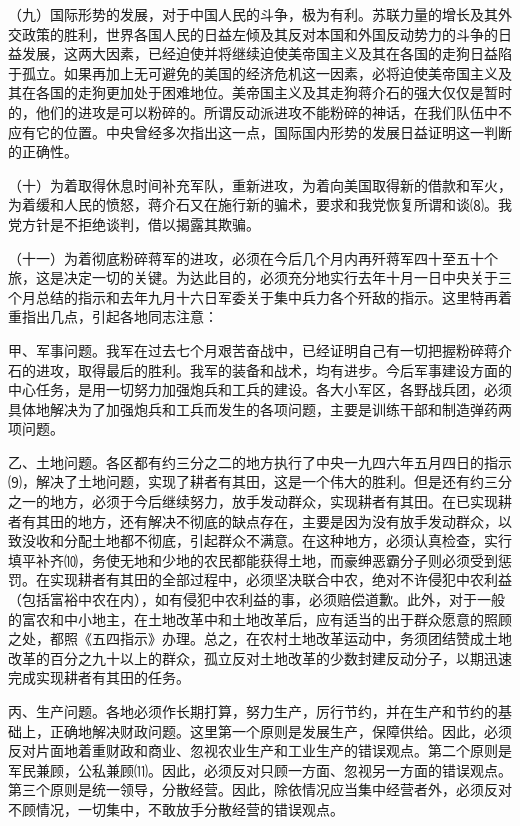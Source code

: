 \documentclass[UTF-8, a5paper, 12pt]{ctexart}
\begin{document}
（九）国际形势的发展，对于中国人民的斗争，极为有利。苏联力量的增长及其外交政策的胜利，世界各国人民的日益左倾及其反对本国和外国反动势力的斗争的日益发展，这两大因素，已经迫使并将继续迫使美帝国主义及其在各国的走狗日益陷于孤立。如果再加上无可避免的美国的经济危机这一因素，必将迫使美帝国主义及其在各国的走狗更加处于困难地位。美帝国主义及其走狗蒋介石的强大仅仅是暂时的，他们的进攻是可以粉碎的。所谓反动派进攻不能粉碎的神话，在我们队伍中不应有它的位置。中央曾经多次指出这一点，国际国内形势的发展日益证明这一判断的正确性。

（十）为着取得休息时间补充军队，重新进攻，为着向美国取得新的借款和军火，为着缓和人民的愤怒，蒋介石又在施行新的骗术，要求和我党恢复所谓和谈⑻。我党方针是不拒绝谈判，借以揭露其欺骗。

（十一）为着彻底粉碎蒋军的进攻，必须在今后几个月内再歼蒋军四十至五十个旅，这是决定一切的关键。为达此目的，必须充分地实行去年十月一日中央关于三个月总结的指示和去年九月十六日军委关于集中兵力各个歼敌的指示。这里特再着重指出几点，引起各地同志注意：

甲、军事问题。我军在过去七个月艰苦奋战中，已经证明自己有一切把握粉碎蒋介石的进攻，取得最后的胜利。我军的装备和战术，均有进步。今后军事建设方面的中心任务，是用一切努力加强炮兵和工兵的建设。各大小军区，各野战兵团，必须具体地解决为了加强炮兵和工兵而发生的各项问题，主要是训练干部和制造弹药两项问题。

乙、土地问题。各区都有约三分之二的地方执行了中央一九四六年五月四日的指示⑼，解决了土地问题，实现了耕者有其田，这是一个伟大的胜利。但是还有约三分之一的地方，必须于今后继续努力，放手发动群众，实现耕者有其田。在已实现耕者有其田的地方，还有解决不彻底的缺点存在，主要是因为没有放手发动群众，以致没收和分配土地都不彻底，引起群众不满意。在这种地方，必须认真检查，实行填平补齐⑽，务使无地和少地的农民都能获得土地，而豪绅恶霸分子则必须受到惩罚。在实现耕者有其田的全部过程中，必须坚决联合中农，绝对不许侵犯中农利益（包括富裕中农在内），如有侵犯中农利益的事，必须赔偿道歉。此外，对于一般的富农和中小地主，在土地改革中和土地改革后，应有适当的出于群众愿意的照顾之处，都照《五四指示》办理。总之，在农村土地改革运动中，务须团结赞成土地改革的百分之九十以上的群众，孤立反对土地改革的少数封建反动分子，以期迅速完成实现耕者有其田的任务。

丙、生产问题。各地必须作长期打算，努力生产，厉行节约，并在生产和节约的基础上，正确地解决财政问题。这里第一个原则是发展生产，保障供给。因此，必须反对片面地着重财政和商业、忽视农业生产和工业生产的错误观点。第二个原则是军民兼顾，公私兼顾⑾。因此，必须反对只顾一方面、忽视另一方面的错误观点。第三个原则是统一领导，分散经营。因此，除依情况应当集中经营者外，必须反对不顾情况，一切集中，不敢放手分散经营的错误观点。
\end{document}
